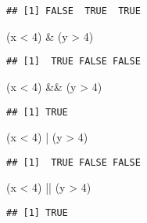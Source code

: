 \documentclass[
]{book}
\newenvironment{Shaded}{\begin{snugshade}}{\end{snugshade}}
\newcommand{\DecValTok}[1]{\textcolor[rgb]{0.00,0.00,0.81}{#1}}
\newcommand{\NormalTok}[1]{#1}
\newcommand{\SpecialCharTok}[1]{\textcolor[rgb]{0.00,0.00,0.00}{#1}}
\begin{document}
\begin{verbatim}
## [1] FALSE  TRUE  TRUE
\end{verbatim}

\begin{Shaded}
\begin{Highlighting}[]
\NormalTok{(x }\SpecialCharTok{\textless{}} \DecValTok{4}\NormalTok{) }\SpecialCharTok{\&}\NormalTok{ (y }\SpecialCharTok{\textgreater{}} \DecValTok{4}\NormalTok{)}
\end{Highlighting}
\end{Shaded}

\begin{verbatim}
## [1]  TRUE FALSE FALSE
\end{verbatim}

\begin{Shaded}
\begin{Highlighting}[]
\NormalTok{(x }\SpecialCharTok{\textless{}} \DecValTok{4}\NormalTok{) }\SpecialCharTok{\&\&}\NormalTok{ (y }\SpecialCharTok{\textgreater{}} \DecValTok{4}\NormalTok{)}
\end{Highlighting}
\end{Shaded}

\begin{verbatim}
## [1] TRUE
\end{verbatim}

\begin{Shaded}
\begin{Highlighting}[]
\NormalTok{(x }\SpecialCharTok{\textless{}} \DecValTok{4}\NormalTok{) }\SpecialCharTok{|}\NormalTok{ (y }\SpecialCharTok{\textgreater{}} \DecValTok{4}\NormalTok{)}
\end{Highlighting}
\end{Shaded}

\begin{verbatim}
## [1]  TRUE FALSE FALSE
\end{verbatim}

\begin{Shaded}
\begin{Highlighting}[]
\NormalTok{(x }\SpecialCharTok{\textless{}} \DecValTok{4}\NormalTok{) }\SpecialCharTok{||}\NormalTok{ (y }\SpecialCharTok{\textgreater{}} \DecValTok{4}\NormalTok{)}
\end{Highlighting}
\end{Shaded}

\begin{verbatim}
## [1] TRUE
\end{verbatim}
\end{document}
